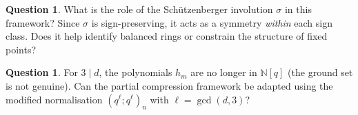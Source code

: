 \documentclass[11pt]{article}
\newcommand{\N}{\mathbb{N}}
\theoremstyle{plain}
\theoremstyle{definition}
\newtheorem{question}[theorem]{Question}
\begin{document}
\begin{question}
What is the role of the Sch\"utzenberger involution
$\sigma$ in this framework?  Since $\sigma$ is
sign-preserving, it acts as a symmetry \emph{within}
each sign class.  Does it help identify balanced rings
or constrain the structure of fixed points?
\end{question}

\begin{question}
For $3 \mid d$, the polynomials $h_m$ are no longer in
$\N[q]$ (the ground set is not genuine).  Can the
partial compression framework be adapted using the
modified normalisation
$(q^\ell; q^\ell)_n$ with $\ell = \gcd(d, 3)$?
\end{question}
\end{document}
